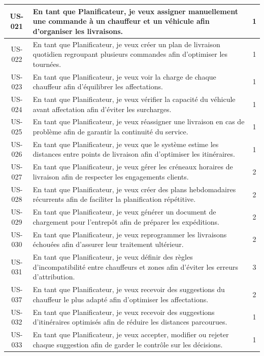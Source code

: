 \begin{longtable}{|c|>{\raggedright\arraybackslash}p{13cm}|c|}
US-021 & En tant que Planificateur, je veux assigner manuellement une commande à un chauffeur et un véhicule afin d'organiser les livraisons. & 1 \\\hline
US-022 & En tant que Planificateur, je veux créer un plan de livraison quotidien regroupant plusieurs commandes afin d'optimiser les tournées. & 1 \\\hline
US-023 & En tant que Planificateur, je veux voir la charge de chaque chauffeur afin d'équilibrer les affectations. & 1 \\\hline
US-024 & En tant que Planificateur, je veux vérifier la capacité du véhicule avant affectation afin d'éviter les surcharges. & 1 \\\hline
US-025 & En tant que Planificateur, je veux réassigner une livraison en cas de problème afin de garantir la continuité du service. & 1 \\\hline
US-026 & En tant que Planificateur, je veux que le système estime les distances entre points de livraison afin d'optimiser les itinéraires. & 1 \\\hline
US-027 & En tant que Planificateur, je veux gérer les créneaux horaires de livraison afin de respecter les engagements clients. & 2 \\\hline
US-028 & En tant que Planificateur, je veux créer des plans hebdomadaires récurrents afin de faciliter la planification répétitive. & 2 \\\hline
US-029 & En tant que Planificateur, je veux générer un document de chargement pour l'entrepôt afin de préparer les expéditions. & 2 \\\hline
US-030 & En tant que Planificateur, je veux reprogrammer les livraisons échouées afin d'assurer leur traitement ultérieur. & 2 \\\hline
US-031 & En tant que Planificateur, je veux définir des règles d'incompatibilité entre chauffeurs et zones afin d'éviter les erreurs d'attribution. & 3 \\\hline
US-037 & En tant que Planificateur, je veux recevoir des suggestions du chauffeur le plus adapté afin d'optimiser les affectations. & 2 \\\hline
US-032 & En tant que Planificateur, je veux recevoir des suggestions d'itinéraires optimisés afin de réduire les distances parcourues. & 1 \\\hline
US-033 & En tant que Planificateur, je veux accepter, modifier ou rejeter chaque suggestion afin de garder le contrôle sur les décisions. & 1 \\\hline

\end{longtable}
